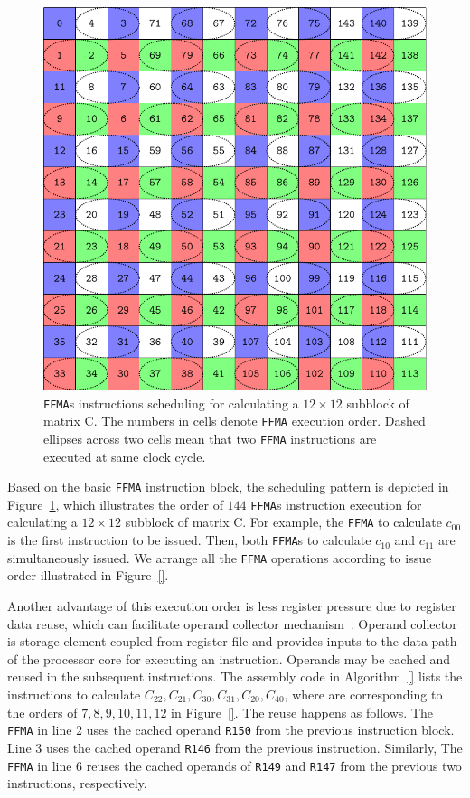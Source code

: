 \documentclass{sig-alternate-05-2015}
\begin{document}
\begin{figure}[htbp]
\begin{center}
\includegraphics[scale=0.5]{order}
\caption{{\tt FFMA}s instructions scheduling for calculating a $12\times 12$ subblock of matrix C.  The numbers in cells denote {\tt FFMA} execution order. Dashed ellipses across two cells mean that two {\tt FFMA} instructions are executed at same clock cycle.}
\label{fig:order}
\end{center}
\end{figure}

Based on the basic {\tt FFMA} instruction block, the scheduling pattern is depicted in Figure~\ref{fig:order}, which
illustrates the order of $144$ {\tt FFMA}s instruction execution for calculating a $12\times 12$ subblock of matrix C. For example, the {\tt FFMA} to calculate $c_{00}$ is the first instruction to be issued. Then, both {\tt FFMA}s to calculate $c_{10}$ and  $c_{11}$ are simultaneously issued. We arrange all the {\tt FFMA} operations according to issue order illustrated in Figure~\ref{}.

Another advantage of this execution order is less register pressure due to register data reuse, which can facilitate operand collector mechanism~\cite{collector}. Operand collector is storage element coupled from register file and provides inputs to the data path of the processor core for executing an instruction. Operands may be cached and reused in the subsequent instructions. The assembly code in Algorithm~\ref{} lists the instructions to calculate $C_{22}, C_{21}, C_{30}, C_{31}, C_{20}, C_{40}$, where are corresponding to the orders of $7,8,9,10,11,12$ in Figure~\ref{}. The reuse happens as follows. The {\tt FFMA} in line 2 uses the cached operand {\tt R150} from the previous instruction block. Line 3 uses the cached operand {\tt R146} from the previous instruction. Similarly, The {\tt FFMA} in line 6 reuses the cached operands of   {\tt R149} and {\tt R147} from the previous two instructions, respectively.
\end{document}
